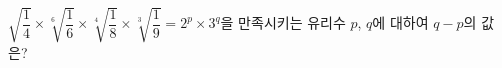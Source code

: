 $\sqrt{\dfrac{1}{4}}\times\sqrt[6]{\dfrac{1}{6}}\times\sqrt[4]{\dfrac{1}{8}}\times\sqrt[3]{\dfrac{1}{9}}=2^p\times3^q$을 만족시키는 유리수 $p$, $q$에 대하여 $q-p$의 값은?
